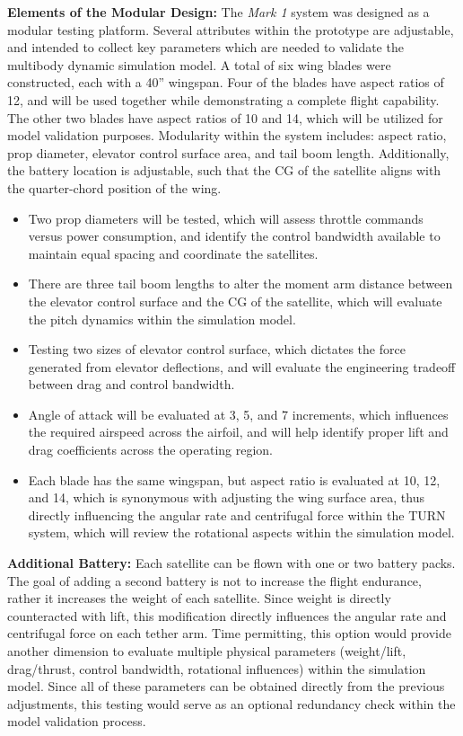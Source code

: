 \documentclass[11pt]{article}
\begin{document}
{\color{green} \bf Elements of the Modular Design:}
The \emph{Mark 1} system was designed as a modular testing platform.  Several attributes within the prototype are adjustable, and intended to collect key parameters which are needed to validate the multibody dynamic simulation model.  A total of six wing blades were constructed, each with a 40'' wingspan.  Four of the blades have aspect ratios of 12, and will be used together while demonstrating a complete flight capability.  The other two blades have aspect ratios of 10 and 14, which will be utilized for model validation purposes.  Modularity within the system includes: aspect ratio, prop diameter, elevator control surface area, and tail boom length.  Additionally, the battery location is adjustable, such that the CG of the satellite aligns with the quarter-chord position of the wing.
\begin{itemize}
\item Two prop diameters will be tested, which will assess throttle commands versus power consumption, and identify the control bandwidth available to maintain equal spacing and coordinate the satellites.
\item There are three tail boom lengths to alter the moment arm distance between the elevator control surface and the CG of the satellite, which will evaluate the pitch dynamics within the simulation model.
\item Testing two sizes of elevator control surface, which dictates the force generated from elevator deflections, and will evaluate the engineering tradeoff between drag and control bandwidth.
\item Angle of attack will be evaluated at 3\degree, 5\degree, and 7\degree{} increments, which influences the required airspeed across the airfoil, and will help identify proper lift and drag coefficients across the operating region.
\item Each blade has the same wingspan, but aspect ratio is evaluated at 10, 12, and 14, which is synonymous with adjusting the wing surface area, thus directly influencing the angular rate and centrifugal force within the TURN system, which will review the rotational aspects within the simulation model.
\end{itemize}


{\color{green} \bf Additional Battery:}
Each satellite can be flown with one or two battery packs.  The goal of adding a second battery is not to increase the flight endurance, rather it increases the weight of each satellite.  Since weight is directly counteracted with lift, this modification directly influences the angular rate and centrifugal force on each tether arm.  Time permitting, this option would provide another dimension to evaluate multiple physical parameters (weight/lift, drag/thrust, control bandwidth, rotational influences) within the simulation model.  Since all of these parameters can be obtained directly from the previous adjustments, this testing would serve as an optional redundancy check within the model validation process.
\end{document}
